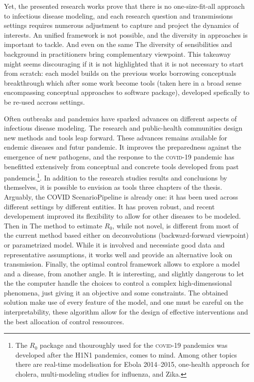 Yet, the presented research works prove that there is no one-size-fit-all approach to infectious disease modeling, and each research question and transmissions settings requires numerous adjustment to capture and project the dynamics of interests. An unified framework is not possible, and the diversity in approaches is important to tackle.  And even on the same The diversity of sensibilities and background in practitioners bring complementary viewpoint.
  This takeaway might seems discouraging if it is not highlighted that it is not necessary to start from scratch: each model builds on the previous works borrowing conceptuals breakthrough which after some work become tools (taken here in a broad sense encompassing conceptual approaches to software package), developed spefically to be re-used accross settings.
  

  Often outbreaks and pandemics have sparked advances on different aspects of infectious disease modeling. The research and public-health communities design new methods and tools leap forward. These advances remains available for endemic diseases and futur pandemic. It improves the preparedness against the emergence of new pathogens, and the response to the \textsc{covid}-19 pandemic has benefitted extensively from conceptual and concrete tools developed from past pandemcis.\footnote{The $R_0$ package and thouroughly used for the \textsc{covid}-19 pandemics was developed after the H1N1 pandemics, comes to mind. Among other topics there are \eg real-time modelisation for Ebola 2014--2015, one-health approach for cholera, multi-modeling studies for influenza, and Zika.}. 
  In addition to the research studies results and conclusions by themselves, it is possible to envision as tools three chapters of the thesis. Arguably, the COVID ScenarioPipeline is already one: it has been used across different settings by different entities. It has proven robust, and recent developement improved its flexibility to allow for other diseases to be modeled. Then in The method to estimate $R_0$, while not novel, is different from most of the current method based either on deconvolutions (backward-forward viewpoint) or parametrized model. While it is involved and necessiate good data and representative assumptions, it works well and provide an alternative look on transmission.
Finally, the optimal control framework allows to explore a model and a disease, from another angle. It is interesting, and slightly dangerous to let the the computer handle the choices to control a complex high-dimenssional  phenomena, just giving it an objective and some constraints. The obtained solution make use of every feature of the model, and one must be careful on the interpretability, these algorithm allow for the design of effective interventions and the best allocation of control ressources. 

